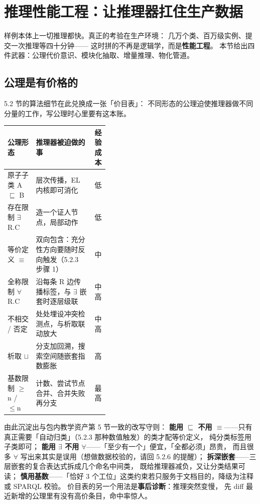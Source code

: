 \section{推理性能工程：让推理器扛住生产数据}

样例本体上一切推理都快。真正的考验在生产环境：
几万个类、百万级实例、提交一次推理等四十分钟——
这时拼的不再是逻辑学，而是\textbf{性能工程}。
本节给出四件武器：公理代价意识、模块化抽取、增量推理、物化管道。

\subsection{公理是有价格的}

5.2 节的算法细节在此兑换成一张「价目表」：
不同形态的公理迫使推理器做不同分量的工作，写公理时心里要有这本账。

\begin{center}
\begin{tabularx}{\linewidth}{@{}p{0.28\linewidth}Xp{0.12\linewidth}@{}}
\toprule
\textbf{公理形态} & \textbf{推理器被迫做的事} & \textbf{经验成本} \\
\midrule
原子子类 A \(\sqsubseteq\) B & 层次传播，EL 内核即可消化 & 低 \\
存在限制 \(\exists\)R.C & 造一个证人节点，局部动作 & 低 \\
等价定义 \(\equiv\) & 双向包含：充分性方向要随时反向触发（5.2.3 步骤 1） & 中 \\
全称限制 \(\forall\)R.C & 沿每条 R 边传播标签，与 \(\exists\) 嵌套时逐层级联 & 中高 \\
不相交 / 否定 & 处处埋设冲突检测点，与析取联动放大 & 中高 \\
析取 \(\sqcup\) & 分支加回溯，搜索空间随嵌套指数膨胀 & 高 \\
基数限制 \(\ge\)n / \(\le\)n & 计数、尝试节点合并、合并失败再分支 & 最高 \\
\bottomrule
\end{tabularx}
\end{center}

由此沉淀出与包内教学资产第 5 节一致的改写守则：
\textbf{能用 \(\sqsubseteq\) 不用 \(\equiv\)}——只有真正需要「自动归类」（5.2.3 那种数值触发）的类才配等价定义，
纯分类标签用子类即可；
\textbf{能用 \(\exists\) 不用 \(\forall\)}——「至少有一个」便宜，「全都必须」昂贵，
而且很多 \(\forall\) 写出来其实是误用（想做数据校验的，请回 5.2.6 的提醒）；
\textbf{拆深嵌套}——三层嵌套的复合表达式拆成几个命名中间类，
既给推理器减负，又让分类结果可读；
\textbf{慎用基数}——「恰好 3 个工位」这类约束若只服务于文档目的，降级为注释或 SPARQL 校验。
价目表的另一个用法是\textbf{事后诊断}：推理突然变慢，
先 diff 最近新增的公理里有没有高价条目，命中率惊人。

